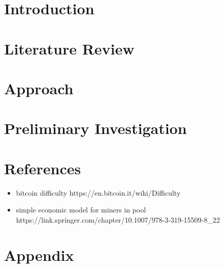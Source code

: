 





\section{Introduction}



\section{Literature Review}



\section{Approach}



\section{Preliminary Investigation}




\newpage

\section{References}

\begin{itemize}
  \item bitcoin difficulty https://en.bitcoin.it/wiki/Difficulty
  \item simple economic model for miners in pool https://link.springer.com/chapter/10.1007/978-3-319-15509-8\_22
\end{itemize}

\printbibliography[heading=none]

\section{Appendix}


